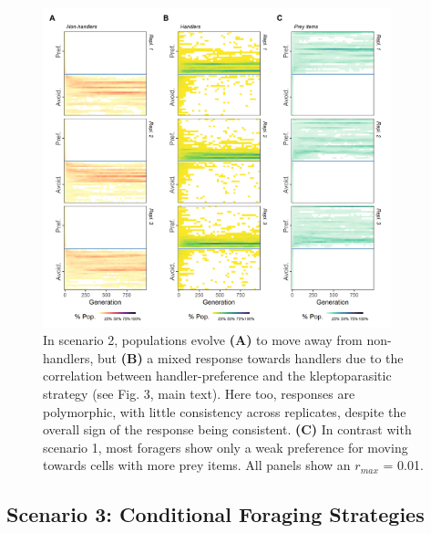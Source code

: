 \documentclass[11pt]{article}
\begin{document}
\begin{figure}[h!]
        \centering
        \includegraphics*[width=0.9\textwidth]{figures/fig_wt_evo_foragers.png}
        \caption{In scenario 2, populations evolve \textbf{(A)} to move away from non-handlers, but \textbf{(B)} a mixed response towards handlers due to the correlation between handler-preference and the kleptoparasitic strategy (see Fig. 3, main text).
        Here too, responses are polymorphic, with little consistency across replicates, despite the overall sign of the response being consistent.
        \textbf{(C)} In contrast with scenario 1, most foragers show only a weak preference for moving towards cells with more prey items.
        All panels show an $r_{max}$ = 0.01.}
\end{figure}

\newpage

\subsection{Scenario 3: Conditional Foraging Strategies}
\end{document}
